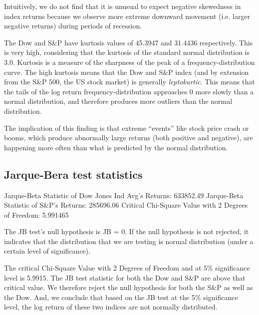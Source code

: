 \documentclass[a4paper]{article}
\begin{document}
Intuitively, we do not find that it is unusual to expect negative skewedness in index returns because we observe more extreme downward movement (i.e. larger negative returns) during periods of recession.

The Dow and S\&P have kurtosis values of 45.3947 and 31.4436 respectively. This is very high, considering that the kurtosis of the standard normal distribution is 3.0. Kurtosis is a measure of the sharpness of the peak of a frequency-distribution curve. The high kurtosis means that the Dow and S\&P index (and by extension from the S\&P 500, the US stock market) is generally \textit{leptokurtic}. This means that the tails of the log return frequency-distribution approaches 0 more slowly than a normal distribution, and therefore produces more outliers than the normal distribution. 

The implication of this finding is that extreme “events” like stock price crash or booms, which produce abnormally large returns (both positive and negative), are happening more often than what is predicted by the normal distribution.


\subsection{Jarque-Bera test statistics}
\begin{flushleft}
Jarque-Beta Statistic of Dow Jones Ind Avg's Returns: 633852.49\linebreak
Jarque-Beta Statistic of S\&P's Returns: 285696.06\linebreak
Critical Chi-Square Value with 2 Degrees of Freedom: 5.991465\linebreak
\end{flushleft}
\vspace{-5mm}
The JB test’s null hypothesis is JB = 0. If the null hypothesis is not rejected, it indicates that the distribution that we are testing is normal distribution (under a certain level of significance).  

The critical Chi-Square Value with 2 Degrees of Freedom and at 5\% significance level is 5.9915. The JB test statistic for both the Dow and S\&P are above that critical value. We therefore reject the null hypothesis for both the S\&P as well as the Dow. And, we conclude that based on the JB test at the 5\% significance level, the log return of these two indices are not normally distributed.
\end{document}
